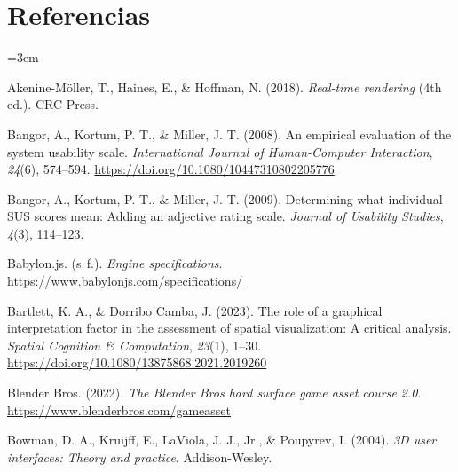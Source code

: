 
\newpage
\section{Referencias}

\begin{list}{}{%
    \setlength{\leftmargin}{1.27cm}
    \setlength{\itemindent}{-1.27cm}
    \setlength{\itemsep}{0pt}
    \setlength{\parsep}{0pt}
    \setlength{\topsep}{0pt}
    \setlength{\listparindent}{0pt}
    \setlength{\labelwidth}{0pt}
    \setlength{\labelsep}{0pt}
}
\RaggedRight
\sloppy
\emergencystretch=3em

\item Akenine-Möller, T., Haines, E., \& Hoffman, N. (2018). \textit{Real-time rendering} (4th ed.). CRC Press.

\item Bangor, A., Kortum, P. T., \& Miller, J. T. (2008). An empirical evaluation of the system usability scale. \textit{International Journal of Human-Computer Interaction}, \textit{24}(6), 574--594. \url{https://doi.org/10.1080/10447310802205776}

\item Bangor, A., Kortum, P. T., \& Miller, J. T. (2009). Determining what individual SUS scores mean: Adding an adjective rating scale. \textit{Journal of Usability Studies}, \textit{4}(3), 114--123.

\item Babylon.js. (s.\,f.). \textit{Engine specifications}. \url{https://www.babylonjs.com/specifications/}

\item Bartlett, K. A., \& Dorribo Camba, J. (2023). The role of a graphical interpretation factor in the assessment of spatial visualization: A critical analysis. \textit{Spatial Cognition \& Computation}, \textit{23}(1), 1--30. \url{https://doi.org/10.1080/13875868.2021.2019260}

\item Blender Bros. (2022). \textit{The Blender Bros hard surface game asset course 2.0}. \url{https://www.blenderbros.com/gameasset}

\item Bowman, D. A., Kruijff, E., LaViola, J. J., Jr., \& Poupyrev, I. (2004). \textit{3D user interfaces: Theory and practice}. Addison-Wesley.


\end{list}
